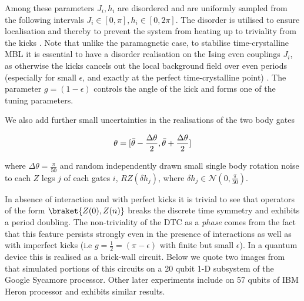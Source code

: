 Among these parameters $J_i, h_i$ are disordered and are uniformly sampled from the following intervals  $J_i \in [0,\pi] , h_i \in [0,2\pi]$.  The disorder is utilised to ensure localisation and thereby to prevent the system from heating up to triviality from the kicks \cite{Vedika2015phasestructre}. Note that unlike the paramagnetic case, to stabilise time-crystalline MBL it is essential to have a disorder realisation on the Ising even couplings $J_i$, as otherwise the kicks cancels out the local background field over even periods (especially for small $\epsilon$, and exactly at the perfect time-crystalline point) \cite{Vedika2021DTCinNISQ}. The parameter $g=(1 - \epsilon)$ controls the angle of the kick and forms one of the tuning parameters.


We also add further small uncertainties in the realisations of the two body gates 

\begin{equation}
    \theta=[\Bar{\theta}-\frac{\Delta\theta}{2},\Bar{\theta}+\frac{\Delta\theta}{2}]
\end{equation}

where $\Delta\theta=\frac{\pi}{50}$ and random independently drawn small single body rotation noise to each $Z$ legs $j$ of each gates $i$, $RZ(\delta h_j)$, where $\delta h_j \in \mathcal{N}(0,\frac{\pi}{50})$.


In absence of interaction and with perfect kicks it is trivial to see that operators of the form $\braket{Z(0),Z(n)}$ breaks the discrete time symmetry and exhibits a period doubling. The non-triviality of the DTC as a \textit{phase} comes from the fact that this feature persists strongly even in the presence of interactions as well as with imperfect kicks (i.e $g=\frac{1}{2}=(\pi-\epsilon)$ with finite but small $\epsilon$). In a quantum device this is realised as a brick-wall circuit. Below we quote two images from \cite{Ippolitti2022GoogleSycamore} that simulated portions of this circuits on a 20 qubit 1-D subsystem of the Google Sycamore processor. Other later experiments include \cite{Frey2022IBMrealization} on 57 qubits of IBM Heron processor and exhibits similar results.


